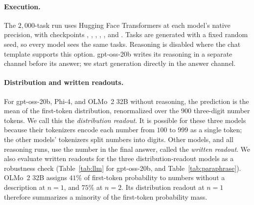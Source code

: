 \paragraph{Execution.}
The $2{,}000$-task run uses Hugging Face Transformers at each model's native precision, with checkpoints , , , , , and . Tasks are generated with a fixed random seed, so every model sees the same tasks. Reasoning is disabled where the chat template supports this option. gpt-oss-20b writes its reasoning in a separate channel before its answer; we start generation directly in the answer channel.

\paragraph{Distribution and written readouts.}
For gpt-oss-20b, Phi-4, and OLMo~2 32B without reasoning, the prediction is the mean of the first-token distribution, renormalized over the $900$ three-digit number tokens. We call this the \emph{distribution readout}. It is possible for these three models because their tokenizers encode each number from $100$ to $999$ as a single token; the other models' tokenizers split numbers into digits. Other models, and all reasoning runs, use the number in the final answer, called the \emph{written readout}. We also evaluate written readouts for the three distribution-readout models as a robustness check (Table~\ref{tab:llm} for gpt-oss-20b, and Table~\ref{tab:paraphrase}). OLMo~2 32B assigns $41\%$ of first-token probability to numbers without a description at $n = 1$, and $75\%$ at $n = 2$. Its distribution readout at $n = 1$ therefore summarizes a minority of the first-token probability mass.

